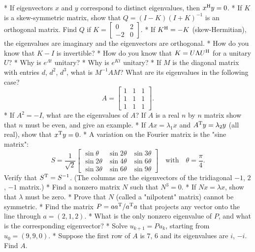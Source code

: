 * If eigenvectors \(x\) and \(y\) correspond to distinct eigenvalues, then \(x^{\rm H}y=0\).
* If \(K\) is a skew-symmetric matrix, show that \(Q=(I-K)(I+K)^{-1}\) is an orthogonal matrix. Find \(Q\) if \(K=\left[\begin{smallmatrix}0&2\\ -2&0\end{smallmatrix}\right]\).
* If \(K^{\rm H}=-K\) (skew-Hermitian), the eigenvalues are imaginary and the eigenvectors are orthogonal.
* How do you know that \(K-I\) is invertible?
* How do you know that \(K=U\Lambda U^{\rm H}\) for a unitary \(U\)?
* Why is \(e^{\Lambda t}\) unitary?
* Why is \(e^{Kt}\) unitary?
* If \(M\) is the diagonal matrix with entries \(d\), \(d^{2}\), \(d^{3}\), what is \(M^{-1}AM\)? What are its eigenvalues in the following case? \[A=\left[\begin{matrix}1&1&1\\ 1&1&1\\ 1&1&1\end{matrix}\right].\]
* If \(A^{2}=-I\), what are the eigenvalues of \(A\)? If \(A\) is a real \(n\) by \(n\) matrix show that \(n\) must be even, and give an example.
* If \(Ax=\lambda_{1}x\) and \(A^{\rm T}y=\lambda_{2}y\) (all real), show that \(x^{\rm T}y=0\).
* A variation on the Fourier matrix is the "sine matrix": \[S=\frac{1}{\sqrt{2}}\left[\begin{matrix}\sin\theta&\sin 2\theta&\sin 3 \theta\\ \sin 2\theta&\sin 4\theta&\sin 6\theta\\ \sin 3\theta&\sin 6\theta&\sin 9\theta\end{matrix}\right]\quad\mbox{with} \quad\theta=\frac{\pi}{4}.\] Verify that \(S^{\rm T}=S^{-1}\). (The columns are the eigenvectors of the tridiagonal \(-1\), \(2\), \(-1\) matrix.)
* Find a nonzero matrix \(N\) such that \(N^{3}=0\).
* If \(Nx=\lambda x\), show that \(\lambda\) must be zero.
* Prove that \(N\) (called a "nilpotent" matrix) cannot be symmetric.
* Find the matrix \(P=aa^{\rm T}/a^{\rm T}a\) that projects any vector onto the line through \(a=(2,1,2)\).
* What is the only nonzero eigenvalue of \(P\), and what is the corresponding eigenvector?
* Solve \(u_{k+1}=Pu_{k}\), starting from \(u_{0}=(9,9,0)\).
* Suppose the first row of \(A\) is \(7\), \(6\) and its eigenvalues are \(i\), \(-i\). Find \(A\).

 